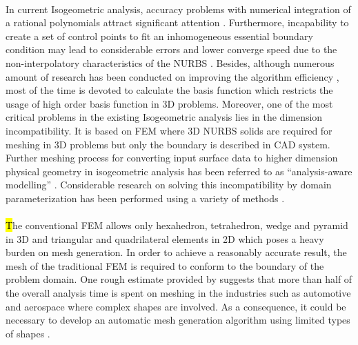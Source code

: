 \paragraph{}
In current Isogeometric analysis, accuracy problems with numerical integration of a rational polynomials attract significant attention \citep{Hug2010,Sev2011,Aur2012}.
Furthermore, incapability to create a set of control points to fit an inhomogeneous essential boundary condition may lead to considerable errors and lower converge speed due to the non-interpolatory characteristics of the NURBS \citep{Wang2010,Wol2011,Koo2013}.
Besides, although numerous amount of research has been conducted on improving the algorithm efficiency \citep{Boo1972,Qin1996,Cho1990,Gra1992,Pan2001,Wang2012}, most of the time is devoted to calculate the basis function which restricts the usage of high order basis function in 3D problems.
Moreover, one of the most critical problems in the existing Isogeometric analysis lies in the dimension incompatibility.
It is based on FEM where 3D NURBS solids are required for meshing in 3D problems but only the boundary is described in CAD system.
Further meshing process for converting input surface data to higher dimension physical geometry in isogeometric analysis has been referred to as ``analysis-aware modelling'' \citep{Coh2010}.
Considerable research on solving this incompatibility by domain parameterization has been performed using a variety of methods \citep{Yang2007,Aig2009,Mar2009,Qian2011}.

\paragraph{}
\hl{T}he conventional FEM allows only hexahedron, tetrahedron, wedge and pyramid in 3D and triangular and quadrilateral elements in 2D which poses a heavy burden on mesh generation.
In order to achieve a reasonably accurate result, the mesh of the traditional FEM is required to conform to the boundary of the problem domain.
One rough estimate provided by \cite{Hug2005} suggests that more than half of the overall analysis time is spent on meshing in the industries such as automotive and aerospace where complex shapes are involved.
As a consequence, it could be necessary to develop an automatic mesh generation algorithm using limited types of shapes \citep{Frey:2007:MGA:1205626}.

